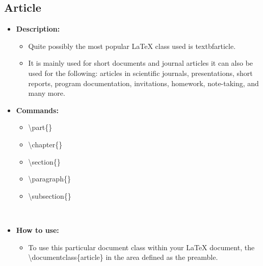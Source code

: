 


\subsection{Article}
\begin{itemize}
   \item \textbf{Description:}
      \begin{itemize}[label={}]
         \item Quite possibly the most popular \LaTeX{} class used is 
         textbf{article}. 
         \item It is mainly used for short documents and 
         journal articles it can also be used for the following: 
         articles in scientific journals, presentations, short reports,
         program documentation, invitations, homework, note-taking, 
         and many more.
      \end{itemize}
   \item \textbf{Commands:}
      \begin{itemize}[label={}]
      \item \textbackslash{part\{\}}
      \item \textbackslash{chapter\{\}}
      \item \textbackslash{section\{\}}
      \item \textbackslash{paragraph\{\}} 
      \item \textbackslash{subsection\{\}}
      \end{itemize} ~\cite{latex_wikia}
   \item \textbf{How to use:}
      \begin{itemize}
      \item To use this particular document class within your \LaTeX{} 
       document, the \textbackslash{documentclass\{article\}} in the 
       area defined as the preamble.
      \end{itemize}
\end{itemize}
~\cite{gmurray_sbalemi}
